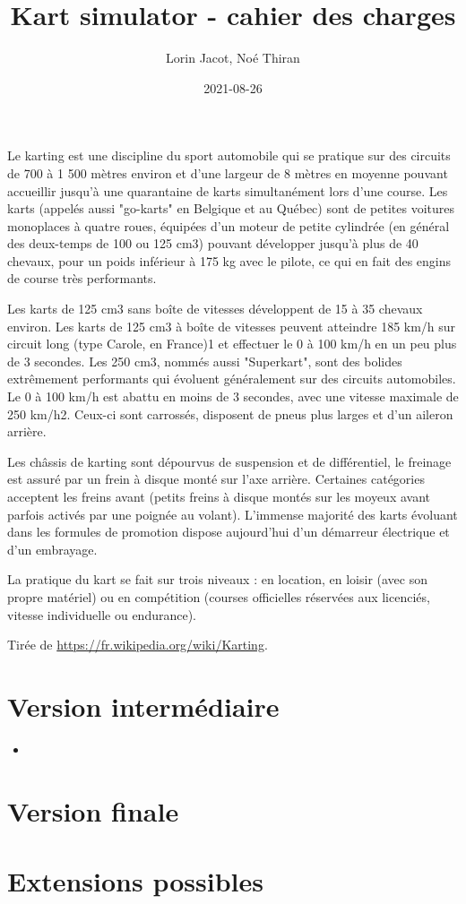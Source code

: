 \documentclass{article}
\title{Kart simulator - cahier des charges}
\date{2021-08-26}
\author{Lorin Jacot, Noé Thiran}
\begin{document}
\maketitle
{}

Le karting est une discipline du sport automobile qui se pratique sur des circuits de 700 à 1 500 mètres environ et d'une largeur de 8 mètres en moyenne pouvant accueillir jusqu'à une quarantaine de karts simultanément lors d'une course. Les karts (appelés aussi "go-karts" en Belgique et au Québec) sont de petites voitures monoplaces à quatre roues, équipées d’un moteur de petite cylindrée (en général des deux-temps de 100 ou 125 cm3) pouvant développer jusqu'à plus de 40 chevaux, pour un poids inférieur à 175 kg avec le pilote, ce qui en fait des engins de course très performants.

Les karts de 125 cm3 sans boîte de vitesses développent de 15 à 35 chevaux environ.
Les karts de 125 cm3 à boîte de vitesses peuvent atteindre 185 km/h sur circuit long (type Carole, en France)1 et effectuer le 0 à 100 km/h en un peu plus de 3 secondes.
Les 250 cm3, nommés aussi "Superkart", sont des bolides extrêmement performants qui évoluent généralement sur des circuits automobiles. Le 0 à 100 km/h est abattu en moins de 3 secondes, avec une vitesse maximale de 250 km/h2. Ceux-ci sont carrossés, disposent de pneus plus larges et d'un aileron arrière.

Les châssis de karting sont dépourvus de suspension et de différentiel, le freinage est assuré par un frein à disque monté sur l'axe arrière. Certaines catégories acceptent les freins avant (petits freins à disque montés sur les moyeux avant parfois activés par une poignée au volant). L'immense majorité des karts évoluant dans les formules de promotion dispose aujourd'hui d'un démarreur électrique et d'un embrayage.

La pratique du kart se fait sur trois niveaux : en location, en loisir (avec son propre matériel) ou en compétition (courses officielles réservées aux licenciés, vitesse individuelle ou endurance).

Tirée de \url{https://fr.wikipedia.org/wiki/Karting}.

\newpage
{}

\section{Version intermédiaire}
\begin{itemize}
    \item
\end{itemize}

\section{Version finale}

\section{Extensions possibles}
\end{document}
